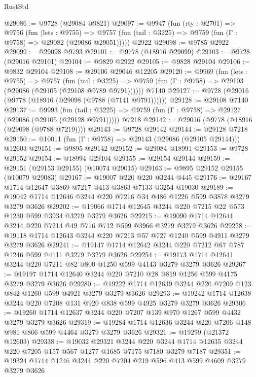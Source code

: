 \begin{lexlean}{RustStd}
\begin{coremodule}
@29086 := @9728 (@29084 @9821)
@29097 := @9947
    (fun (rty : @2701) =>
    @9756
      (fun (lets : @9755) =>
      @9757 (fun (tail : @3225) => @9759 (fun (Γ : @9758) => @29082 (@29086 @29051)))))
    @2922
@29098 := @9785 @2922
@29099 := @29098 @9793
@29101 := @9778 (@18916 @29099)
@29103 := @9728 (@29016 @29101)
@29104 := @9829 @2922
@29105 := @9828 @29104
@29106 := @9832 @29104
@29108 := @29106 @29046 @12205
@29120 := @9969
    (fun (lets : @9755) =>
    @9757
      (fun (tail : @3225) =>
      @9759 (fun (Γ : @9758) => @29103 (@29086 (@29105 (@29108 @9789 @9791))))))
    @7140
@29127 := @9728 (@29016 (@9778 (@18916 (@29098 (@9788 (@7141 @9791))))))
@29128 := @29108 @7140
@29137 := @9993
    (fun (tail : @3225) => @9759 (fun (Γ : @9758) => @29127 (@29086 (@29105 (@29128 @9791)))))
    @7218
@29142 := @29016 (@9778 (@18916 (@29098 (@9788 @7219))))
@29143 := @9728 @29142
@29144 := @29128 @7218
@29150 := @10011 (fun (Γ : @9758) => @29143 (@29086 (@29105 @29144))) @12603
@29151 := @9895 @29142
@29152 := @29084 @18991
@29153 := @9728 @29152
@29154 := @18994 @29104
@29155 := @29154 @29144
@29159 := @29151 (@29153 @29155) (@10074 @29015)
@29163 := @9895 @29152 @29155 (@10079 @29083)
@29167 := @19007 @220 @220 @3244 @445
@29176 := @29167 @1714 @12647 @3869 @7217 @413 @3863 @7133 @3254 @19030
@29189 := @19042 @1714 @12646 @3244 @220 @7216 @34 @486 @1226 @599 @3878 @3279 @3279 @3626
@29202 := @19066 @1714 @12645 @3244 @220 @7215 @22 @573 @1230 @599 @3934 @3279 @3279 @3626
@29215 := @19090 @1714 @12644 @3244 @220 @7214 @49 @716 @712 @599 @3966 @3279 @3279 @3626
@29228 := @19118 @1714 @12643 @3244 @220 @7213 @57 @727 @1240 @599 @4911 @3279 @3279 @3626
@29241 := @19147 @1714 @12642 @3244 @220 @7212 @67 @787 @1246 @599 @4111 @3279 @3279 @3626
@29254 := @19173 @1714 @12641 @3244 @220 @7211 @82 @800 @1250 @599 @4143 @3279 @3279 @3626
@29267 := @19197 @1714 @12640 @3244 @220 @7210 @28 @819 @1256 @599 @4175 @3279 @3279 @3626
@29280 := @19222 @1714 @12639 @3244 @220 @7209 @123 @842 @1260 @599 @4921 @3279 @3279 @3626
@29293 := @19242 @1714 @12638 @3244 @220 @7208 @131 @920 @838 @599 @4925 @3279 @3279 @3626
@29306 := @19260 @1714 @12637 @3244 @220 @7207 @139 @970 @1267 @599 @4432 @3279 @3279 @3626
@29319 := @19284 @1714 @12636 @3244 @220 @7206 @148 @981 @866 @599 @4464 @3279 @3279 @3626
@29321 := @19299 (@21372 @12603)
@29338 := @19032
    @29321
    @3244
    @220
    @3244
    @1714
    @12635
    @3244
    @220
    @7205
    @157
    @567
    @1277
    @1685
    @7175
    @7180
    @3279
    @7187
@29351 := @19324 @1714 @1246 @3244 @220 @7204 @219 @596 @413 @599 @4609 @3279 @3279 @3626

\end{coremodule}
\end{lexlean}
